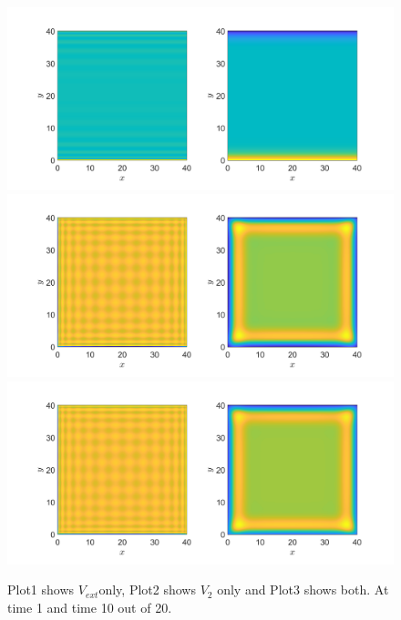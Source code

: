 \documentclass[11pt, a4paper]{article}
\theoremstyle{definition}
\begin{document}
\begin{figure}[h]
	\centering
	\includegraphics[scale=0.25]{OneShape1.png}
	\includegraphics[scale=0.25]{OneShape2.png}
	\includegraphics[scale=0.25]{OneShape3.png}
	\caption{Plot1 shows $V_{ext}$only, Plot2 shows $V_2$ only and Plot3 shows both. At time 1 and time 10 out of 20.} 
	\label{F10}
\end{figure}
\end{document}
